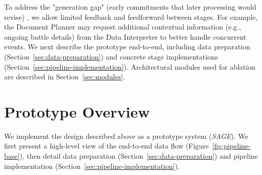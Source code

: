 To address the "generation gap" (early commitments that later processing would revise) \cite{gatt2018}, we allow limited feedback and feedforward between stages. For example, the Document Planner may request additional contextual information (e.g., ongoing battle details) from the Data Interpreter to better handle concurrent events.
We next describe the prototype end-to-end, including data preparation (Section~\ref{sec:data-preparation}) and concrete stage implementations (Section~\ref{sec:pipeline-implementation}). Architectural modules used for ablation are described in Section~\ref{sec:modules}.

\section{Prototype Overview}
We implement the design described above as a prototype system (\textit{SAGE}). We first present a high-level view of the end-to-end data flow (Figure~\ref{fig:pipeline-base}), then detail data preparation (Section~\ref{sec:data-preparation}) and pipeline implementation (Section~\ref{sec:pipeline-implementation}).

